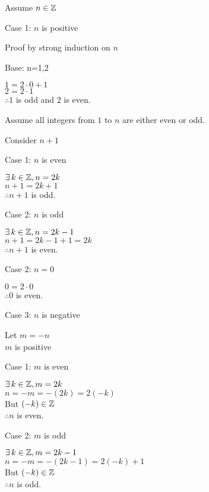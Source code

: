 \documentclass[letterpaper,12pt,fleqn]{article}
\begin{document}
\begin{theproof}
  Assume $n\in\mathbb{Z}$
  \begin{description}
  \item{Case 1: $n$ is positive}

    Proof by strong induction on $n$

    \begin{description}
    \item {Base: n=1,2}

      $1=2\cdot0+1$ \\
      $2=2\cdot1$ \\
      $\therefore 1$ is odd and $2$ is even.

    \item Assume all integers from $1$ to $n$ are either even or odd.

    \item Consider $n+1$

      \begin{description}
      \item {Case 1: $n$ is even}

        $\exists\,k\in\mathbb{Z},n=2k$ \\
        $n+1=2k+1$ \\
        $\therefore n+1$ is odd.
        
      \item {Case 2: $n$ is odd}

        $\exists\,k\in\mathbb{Z},n=2k-1$ \\
        $n+1=2k-1+1=2k$ \\
        $\therefore n+1$ is even.
      \end{description}
    \end{description}

  \item {Case 2: $n=0$}

    $0=2\cdot0$ \\
    $\therefore 0$ is even.

  \item {Case 3: $n$ is negative}

    Let $m=-n$ \\
    $m$ is positive
    
    \begin{description}
    \item {Case 1: $m$ is even}

      $\exists\,k\in\mathbb{Z},m=2k$ \\
      $n=-m=-(2k)=2(-k)$ \\
      But $(-k)\in\mathbb{Z}$ \\
      $\therefore n$ is even.
      
    \item {Case 2: $m$ is odd}

      $\exists\,k\in\mathbb{Z},m=2k-1$ \\
      $n=-m=-(2k-1)=2(-k)+1$ \\
      But $(-k)\in\mathbb{Z}$ \\
      $\therefore n$ is odd.
    \end{description}
  \end{description}
\end{theproof}
\end{document}
